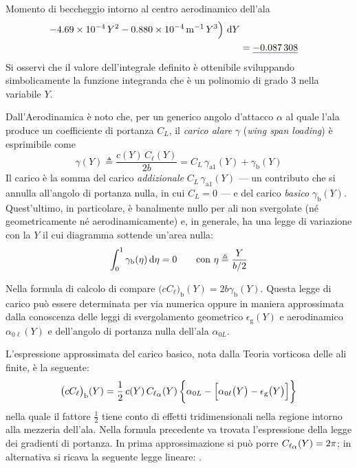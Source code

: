 \documentclass[[12pt,twoside]{book}
\begin{document}
\begin{myExampleX}{Momento di beccheggio intorno al centro aerodinamico dell'ala}{}
\[\begin{split}
      \SI[round-mode=figures,round-precision=3,
        fixed-exponent=-4,
        scientific-notation=fixed %
        ]{\myCoeffCWing}{}\, Y^2
      \SI[round-mode=figures,round-precision=3,
        fixed-exponent=-4,
        scientific-notation=fixed
        ]{\myCoeffDWing}{\metre^{-1}}\, Y^3
    \Big)
    \, \diff{Y}
\\
  & {}= \mathunderline{mydarkblue}{ \SI[round-precision=4]{\myCmZeroAWing}{} }
\end{split}
\]
Si osservi che il valore dell'integrale definito è ottenibile sviluppando simbolicamente
la funzione integranda che è un polinomio di grado $3$ nella variabile $Y$.

\smallskip
Dall'Aerodinamica è noto che, per un generico angolo d'attacco $\alpha$ al quale l'ala produce un
coefficiente di portanza $C_L$,
il \emph{carico alare} $\gamma$ (\emph{wing span loading}) è esprimibile come
\[
\gamma(Y) \triangleq \frac{c(Y) \, C_\ell (Y)}{2 b} = C_L \, \gamma_{\mathrm{a}1}(Y) + \gamma_\mathrm{b}(Y) 
\]
Il carico è la somma del carico \emph{addizionale} $C_L \, \gamma_{\mathrm{a}1}(Y)$
--- un contributo che si annulla all'angolo di portanza nulla, in cui $C_L=0$ ---
e del carico \emph{basico} $\gamma_\mathrm{b}(Y)$.
Quest'ultimo, in particolare, è banalmente nullo per ali non svergolate (né geometricamente né aerodinamicamente)
e, in generale, ha una legge di variazione con la $Y$ il cui diagramma sottende un'area nulla:
\[
\int_0^{1} \gamma_\mathrm{b}(\eta) \mathop{}\!\mathrm{d}{\eta} = 0 \qquad \text{con $\eta \triangleq \dfrac{Y}{b/2}$}
\]

Nella formula di calcolo di 
compare $\big(cC_{\ell}\big)_\mathrm{b}(Y) = 2b\gamma_\mathrm{b}(Y)$.
Questa legge di carico può essere determinata per via numerica oppure in maniera approssimata 
dalla conoscenza delle leggi di svergolamento geometrico $\epsilon_\mathrm{g}(Y)$ e aerodinamico
$\alpha_{0\ell}(Y)$ e dell'angolo di portanza nulla dell'ala $\alpha_{0L}$.

L'espressione approssimata del carico basico, nota dalla Teoria vorticosa delle ali finite, è la seguente:
\[
\big(cC_{\ell}\big)_\mathrm{b}(Y)
  = \frac{1}{2} \, c(Y) \, C_{\ell_\mathlarger{\alpha}}(Y) \,
    \bigg\{ \alpha_{0L} - \Big[ \alpha_{0\ell}\big(Y\big) - \epsilon_\mathrm{g}\big(Y\big) \Big] \bigg\}
\]
nella quale il fattore $\frac{1}{2}$ tiene conto di effetti tridimensionali nella regione intorno
alla mezzeria dell'ala.
%
Nella formula precedente va trovata l'espressione della legge dei gradienti di portanza.
In prima approssimazione si può porre 
$C_{\ell_\mathlarger{\alpha}} (Y)=2\pi$; in alternativa si ricava la seguente legge lineare:
.


\end{myExampleX}
\end{document}
